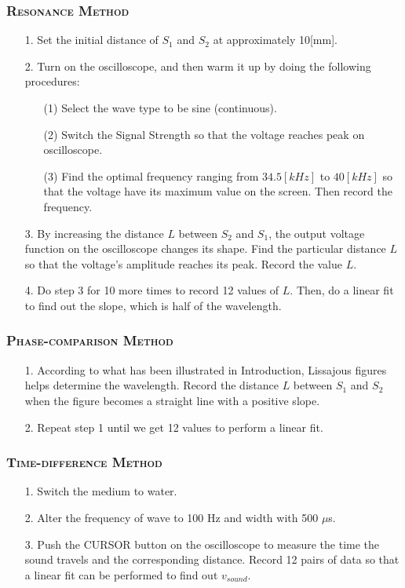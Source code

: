 \documentclass[a4paper,12pt]{article}
\begin{document}
\subsubsection{\textsc{Resonance Method}}
\begin{itemize}
\item[1.]
Set the initial distance of \textit{$S_1$} and \textit{$S_2$} at approximately 10[mm].
\item[2.]
Turn on the oscilloscope, and then warm it up by doing the following procedures:
	\begin{itemize}
	\item[(1)] 
	Select the wave type to be sine (continuous).
	\item[(2)]
	Switch the Signal Strength so that the voltage reaches peak on oscilloscope.
	\item[(3)]
	Find the optimal frequency ranging from $34.5[kHz]$ to $40[kHz]$ so that the voltage have its maximum value on the screen. Then record the frequency.
	\end{itemize}
\item[3.]
By increasing the distance $L$ between \textit{$S_2$} and \textit{$S_1$}, the output voltage function on the oscilloscope changes its shape. Find the particular distance $L$ so that the voltage's amplitude reaches its peak. Record the value $L$.
\item[4.]
Do step 3 for 10 more times to record 12 values of $L$. Then, do a linear fit to find out the slope, which is half of the wavelength. 
\end{itemize}
\subsubsection{\textsc{Phase-comparison Method}}
\begin{itemize}
\item[1.] 
According to what has been illustrated in Introduction, Lissajous figures helps determine the wavelength. Record the distance $L$ between \textit{$S_1$} and \textit{$S_2$} when the figure becomes a straight line with a positive slope.
\item[2.]
Repeat step 1 until we get 12 values to perform a linear fit. 
\end{itemize}
\subsubsection{\textsc{Time-difference Method}}
\begin{itemize}
\item[1.] 
Switch the medium to water.
\item[2.]
Alter the frequency of wave to 100 Hz and width with 500 $\mu$s.
\item[3.]
Push the CURSOR button on the oscilloscope to measure the time the sound travels and the corresponding distance. Record 12 pairs of data so that a linear fit can be performed to find out $v_{sound}$.
\end{itemize}
\end{document}
